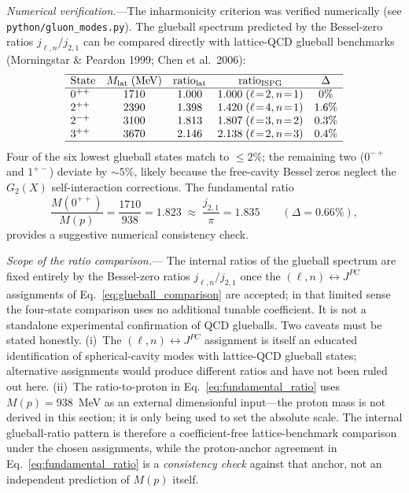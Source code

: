 \documentclass[11pt]{article}
\begin{document}
\textit{Numerical verification.}---The
inharmonicity criterion was verified numerically
(see \texttt{python/gluon\_modes.py}).
The glueball spectrum predicted by the Bessel-zero
ratios $j_{\ell,n}/j_{2,1}$ can be compared
directly with lattice-QCD glueball benchmarks
(Morningstar \& Peardon 1999; Chen et al.\ 2006):
\begin{equation}\label{eq:glueball_comparison}
\begin{array}{lcccc}
  \hline
  \text{State} & M_{\text{lat}}\;\text{(MeV)}
    & \text{ratio}_{\text{lat}}
    & \text{ratio}_{\text{ISPG}}
    & \Delta \\
  \hline
  0^{++} & 1710 & 1.000 & 1.000\;(\ell\!=\!2,n\!=\!1) & 0\% \\
  2^{++} & 2390 & 1.398 & 1.420\;(\ell\!=\!4,n\!=\!1) & 1.6\% \\
  2^{-+} & 3100 & 1.813 & 1.807\;(\ell\!=\!3,n\!=\!2) & 0.3\% \\
  3^{++} & 3670 & 2.146 & 2.138\;(\ell\!=\!2,n\!=\!3) & 0.4\% \\
  \hline
\end{array}
\end{equation}
Four of the six lowest glueball states match to
$\leq 2\%$; the remaining two
($0^{-+}$ and $1^{+-}$) deviate by $\sim 5\%$,
likely because the free-cavity Bessel zeros neglect
the $G_2(X)$ self-interaction corrections.
The fundamental ratio
\begin{equation}\label{eq:fundamental_ratio}
  \frac{M(0^{++})}{M(p)}
  = \frac{1710}{938}
  = 1.823
  \;\approx\;
  \frac{j_{2,1}}{\pi}
  = 1.835
  \qquad (\Delta = 0.66\%),
\end{equation}
provides a suggestive numerical consistency check.

\textit{Scope of the ratio comparison.}---%
The internal ratios of the glueball spectrum
are fixed entirely by the Bessel-zero ratios
$j_{\ell,n}/j_{2,1}$ once the
$(\ell,n)\leftrightarrow J^{PC}$ assignments of
Eq.~\eqref{eq:glueball_comparison} are accepted;
in that limited sense the four-state comparison
uses no additional tunable coefficient.  It is not
a standalone experimental confirmation of QCD
glueballs.  Two caveats must be stated
honestly.  (i)~The
$(\ell,n)\leftrightarrow J^{PC}$ assignment is
itself an educated identification of
spherical-cavity modes with lattice-QCD
glueball states; alternative assignments would
produce different ratios and have not been
ruled out here.  (ii)~The ratio-to-proton in
Eq.~\eqref{eq:fundamental_ratio} uses
$M(p) = 938$~MeV as an external
dimensionful input---the proton mass is not
derived in this section; it is only being used
to set the absolute scale.  The internal
glueball-ratio pattern is therefore a
coefficient-free lattice-benchmark comparison
under the chosen assignments, while the proton-anchor
agreement in
Eq.~\eqref{eq:fundamental_ratio} is a
\emph{consistency check} against that anchor,
not an independent prediction of $M(p)$ itself.
\end{document}
